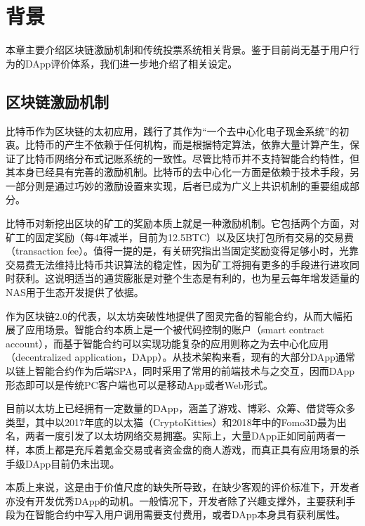 \section{背景}
本章主要介绍区块链激励机制和传统投票系统相关背景。鉴于目前尚无基于用户行为的DApp评价体系，我们进一步地介绍了相关设定。

\subsection{区块链激励机制}
比特币作为区块链的太初应用，践行了其作为“一个去中心化电子现金系统”的初衷。比特币的产生不依赖于任何机构，而是根据特定算法，依靠大量计算产生，保证了比特币网络分布式记账系统的一致性。尽管比特币并不支持智能合约特性，但其本身已经具有完善的激励机制。比特币的去中心化一方面是依赖于技术手段，另一部分则是通过巧妙的激励设置来实现，后者已成为广义上共识机制的重要组成部分。

比特币对新挖出区块的矿工的奖励本质上就是一种激励机制。它包括两个方面，对矿工的固定奖励（每4年减半，目前为12.5BTC）以及区块打包所有交易的交易费（transaction fee）。值得一提的是，有关研究指出当固定奖励变得足够小时，光靠交易费无法维持比特币共识算法的稳定性，因为矿工将拥有更多的手段进行进攻同时获利\cite{carlsten2016instability}。这说明适当的通货膨胀是对整个生态是有利的，也为星云每年增发适量的NAS用于生态开发提供了依据。

作为区块链2.0的代表，以太坊突破性地提供了图灵完备的智能合约，从而大幅拓展了应用场景。智能合约本质上是一个被代码控制的账户（smart contract account），而基于智能合约可以实现功能复杂的应用则称之为去中心化应用（decentralized application，DApp）。从技术架构来看，现有的大部分DApp通常以链上智能合约作为后端SPA，同时采用了常用的前端技术与之交互，因而DApp形态即可以是传统PC客户端也可以是移动App或者Web形式。

目前以太坊上已经拥有一定数量的DApp，涵盖了游戏、博彩、众筹、借贷等众多类型，其中以2017年底的以太猫（CryptoKitties）和2018年中的Fomo3D\cite{Fomo3D}最为出名，两者一度引发了以太坊网络交易拥塞。实际上，大量DApp正如同前两者一样，本质上都是充斥着氪金交易或者资金盘的商人游戏，而真正具有应用场景的杀手级DApp目前仍未出现\cite{Nabulasyellowpaper}。

本质上来说，这是由于价值尺度的缺失所导致，在缺少客观的评价标准下，开发者亦没有开发优秀DApp的动机。一般情况下，开发者除了兴趣支撑外，主要获利手段为在智能合约中写入用户调用需要支付费用，或者DApp本身具有获利属性。




